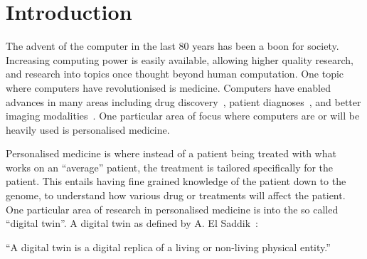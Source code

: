 \chapter{Introduction}






The advent of the computer in the last 80 years has been a boon for society.
Increasing computing power is easily available, allowing higher quality research, and research into topics once thought beyond human computation.
One topic where computers have revolutionised is medicine.
Computers have enabled advances in many areas including drug discovery~\cite{aaqvist1994new,lill2011computer}, patient diagnoses~\cite{liu2014early,sun2016computer}, and better imaging modalities~\cite{brooks1976principles,al2012digital}.
One particular area of focus where computers are or will be heavily used is personalised medicine.

Personalised medicine is where instead of a patient being treated with what works on an ``average'' patient, the treatment is tailored specifically for the patient.
This entails having fine grained knowledge of the patient down to the genome, to understand how various drug or treatments will affect the patient.
One particular area of research  in personalised medicine is into the so called ``digital twin''.
A digital twin as defined by A. El Saddik~\cite{el2018digital}:

\medskip
``A digital twin is a digital replica of a living or non-living physical entity.''
\medskip


